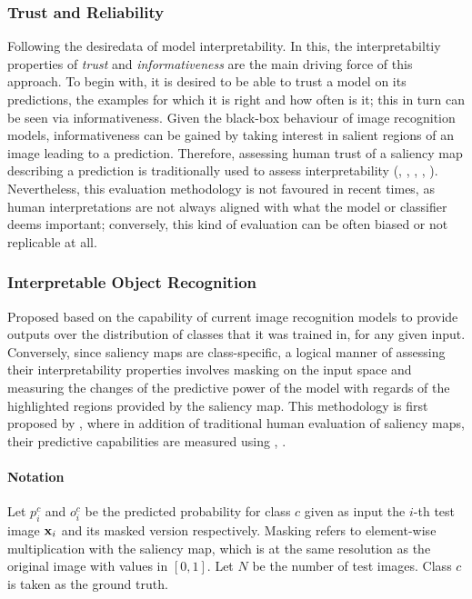 \subsubsection{Trust and Reliability} Following the desiredata of model interpretability. In this, 
the interpretabiltiy properties of \emph{trust} and \emph{informativeness} are the main driving 
force of this approach. To begin with, it is desired to be able to trust a model on its predictions, 
the examples for which it is right and how often is it; this in turn can be seen via 
informativeness. Given the black-box behaviour of image recognition models, informativeness can be 
gained by taking interest in salient regions of an image leading to a prediction. Therefore, 
assessing human trust of a saliency map describing a prediction is traditionally used to assess 
interpretability (\cite{ribeiro2016should}, \cite{zhou2016learning}, \cite{selvaraju2017grad}, 
\cite{chattopadhay2018grad}, \cite{bau2017network}). Nevertheless, this evaluation methodology is 
not favoured in recent times, as human interpretations are not always aligned with what the model 
or classifier deems important; conversely, this kind of evaluation can be often biased or not 
replicable at all.

\subsubsection{Interpretable Object Recognition} 
\label{sec:class_metrics}
Proposed based on the capability of current image 
recognition models to provide outputs over the distribution of classes that it was trained in, 
for any given input. Conversely, since saliency maps are class-specific, a logical manner of 
assessing their interpretability properties involves masking on the input space and measuring the 
changes of the predictive power of the model with regards of the highlighted regions provided by 
the saliency map. This methodology is first proposed by \cite{chattopadhay2018grad}, where in 
addition of traditional human evaluation of saliency maps, their predictive capabilities are 
measured using , .\\

\paragraph{Notation}
Let $p^c_i$ and $o^c_i$ be the predicted probability for class $c$ given as input  the $i$-th test 
image $\mathbf{x}_i$ and its masked version respectively. Masking refers to element-wise multiplication 
with the saliency map, which is at the same resolution as the original image with values in $[0,1]$. 
Let $N$ be the number of test images. Class $c$ is taken as the ground truth.\\

